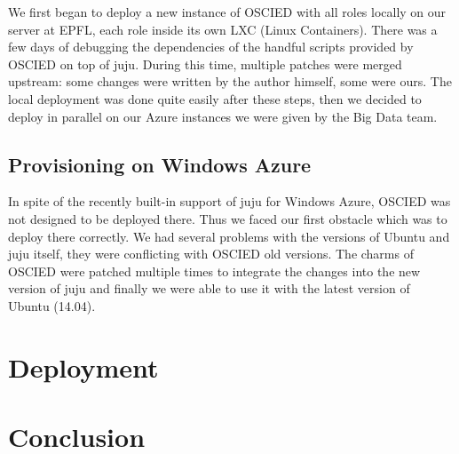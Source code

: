 \documentclass[a4paper,12pt]{article}
\begin{document}
We first began to deploy a new instance of OSCIED with all roles locally on our server at EPFL, each role inside its own LXC (Linux Containers).
There was a few days of debugging the dependencies of the handful scripts provided by OSCIED on top of juju.
During this time, multiple patches were merged upstream: some changes were written by the author himself, some were ours.
The local deployment was done quite easily after these steps, then we decided to deploy in parallel on our Azure instances we were given by the Big Data team.

\subsection{Provisioning on Windows Azure}
In spite of the recently built-in support of juju for Windows Azure, OSCIED was not designed to be deployed there.
Thus we faced our first obstacle which was to deploy there correctly.
We had several problems with the versions of Ubuntu and juju itself, they were conflicting with OSCIED old versions.
The charms of OSCIED were patched multiple times to integrate the changes into the new version of juju and finally we were able to use it with the latest version of Ubuntu (14.04).


\section{Deployment}

\section{Conclusion}
\end{document}
